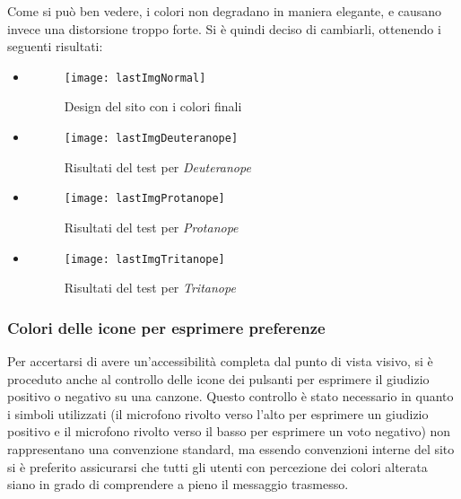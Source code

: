 Come si può ben vedere, i colori non degradano in maniera elegante, e causano invece una distorsione troppo forte. Si è quindi deciso di cambiarli, ottenendo i seguenti risultati:
\begin{itemize}

    \item[]
       \begin{figure}[H]

            \centering
            \texttt{[image: lastImgNormal]}
            \caption{Design del sito con i colori finali}
        \end{figure}

    \item[]
        \begin{figure}[H]

            \centering
            \texttt{[image: lastImgDeuteranope]}
            \caption{Risultati del test per \textit{Deuteranope}}
        \end{figure}

    \item[]
        \begin{figure}[H]

            \centering
            \texttt{[image: lastImgProtanope]}
            \caption{Risultati del test per \textit{Protanope}}
        \end{figure}

    \item[]
        \begin{figure}[H]

            \centering
            \texttt{[image: lastImgTritanope]}
            \caption{Risultati del test per \textit{Tritanope}}
        \end{figure}

\end{itemize}


\subsubsection{Colori delle icone per esprimere preferenze}
Per accertarsi di avere un'accessibilit\`a completa dal punto di vista visivo, si \`e proceduto anche al controllo delle icone dei pulsanti per esprimere il giudizio positivo o negativo su una canzone. Questo controllo \`e stato necessario in quanto i simboli utilizzati (il microfono rivolto verso l'alto per esprimere un giudizio positivo e il microfono rivolto verso il basso per esprimere un voto negativo) non rappresentano una convenzione standard, ma essendo convenzioni interne del sito si \`e preferito assicurarsi che tutti gli utenti con percezione dei colori alterata siano in grado di comprendere a pieno il messaggio trasmesso.

